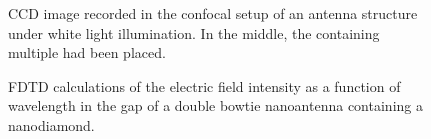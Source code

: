 		\begin{figure}[tp]
			\centering
			\caption{CCD image recorded in the confocal setup of an antenna structure under white light illumination. In the middle, the \nd containing multiple \sivs had been placed.}
			\label{fig::place_ccd}
		\end{figure}

		\begin{figure}[tp]
			\centering
			\caption{FDTD calculations of the electric field intensity as a function of wavelength in the gap of a double bowtie nanoantenna containing a nanodiamond.}
			\label{fig::antenna_fdtd_calculation}
		\end{figure}

